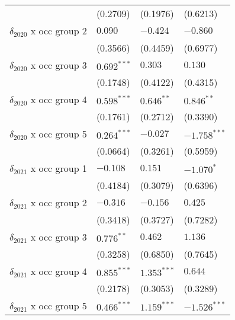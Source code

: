 \begin{tabular}{llll}
                                       &           (0.2709) &           (0.1976) &           (0.6213) \\
$\delta_{2020}$ x occ group 2          &            $0.090$ &           $-0.424$ &           $-0.860$ \\
                                       &           (0.3566) &           (0.4459) &           (0.6977) \\
$\delta_{2020}$ x occ group 3          &      $0.692^{***}$ &            $0.303$ &            $0.130$ \\
                                       &           (0.1748) &           (0.4122) &           (0.4315) \\
$\delta_{2020}$ x occ group 4          &      $0.598^{***}$ &       $0.646^{**}$ &       $0.846^{**}$ \\
                                       &           (0.1761) &           (0.2712) &           (0.3390) \\
$\delta_{2020}$ x occ group 5          &      $0.264^{***}$ &           $-0.027$ &     $-1.758^{***}$ \\
                                       &           (0.0664) &           (0.3261) &           (0.5959) \\
$\delta_{2021}$ x occ group 1          &           $-0.108$ &            $0.151$ &         $-1.070^*$ \\
                                       &           (0.4184) &           (0.3079) &           (0.6396) \\
$\delta_{2021}$ x occ group 2          &           $-0.316$ &           $-0.156$ &            $0.425$ \\
                                       &           (0.3418) &           (0.3727) &           (0.7282) \\
$\delta_{2021}$ x occ group 3          &       $0.776^{**}$ &            $0.462$ &            $1.136$ \\
                                       &           (0.3258) &           (0.6850) &           (0.7645) \\
$\delta_{2021}$ x occ group 4          &      $0.855^{***}$ &      $1.353^{***}$ &            $0.644$ \\
                                       &           (0.2178) &           (0.3053) &           (0.3289) \\
$\delta_{2021}$ x occ group 5          &      $0.466^{***}$ &      $1.159^{***}$ &     $-1.526^{***}$ \\

\end{tabular}
